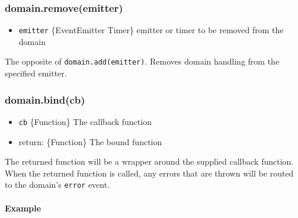 \subsubsection{domain.remove(emitter)}

\begin{itemize}
\item
  \texttt{emitter} \{EventEmitter \textbar{} Timer\} emitter or timer to
  be removed from the domain
\end{itemize}

The opposite of \texttt{domain.add(emitter)}. Removes domain handling
from the specified emitter.

\subsubsection{domain.bind(cb)}

\begin{itemize}
\item
  \texttt{cb} \{Function\} The callback function
\item
  return: \{Function\} The bound function
\end{itemize}

The returned function will be a wrapper around the supplied callback
function. When the returned function is called, any errors that are
thrown will be routed to the domain's \texttt{error} event.

\paragraph{Example}

\begin{Shaded}
\begin{Highlighting}[]
 \NormalTok{();}

 
  \NormalTok{(}
     
  \NormalTok{\}));}
\NormalTok{\}}

\NormalTok{(}\NormalTok{, }
\NormalTok{\});}
\end{Highlighting}
\end{Shaded}

